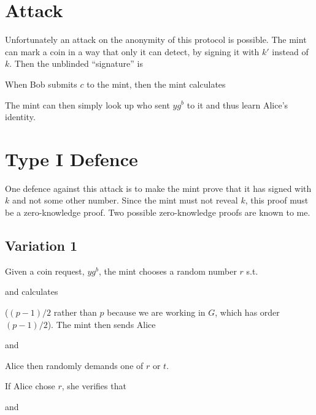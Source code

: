\documentclass[a4paper,titlepage]{article}
\begin{document}
\section{Attack}

Unfortunately an attack on the anonymity of this protocol is
possible. The mint can mark a coin in a way that only it can detect,
by signing it with $k'$ instead of $k$. Then the unblinded
``signature'' is


When Bob submits $c$ to the mint, then the mint calculates


The mint can then simply look up who sent $y g^b$ to it and thus learn
Alice's identity.

\section{Type I Defence}

One defence against this attack is to make the mint prove that it has
signed with $k$ and not some other number. Since the mint must not
reveal $k$, this proof must be a zero-knowledge proof. Two possible
zero-knowledge proofs are known to me.

\subsection{Variation 1\cite{Goldberg2}}

Given a coin request, $y g^b$, the mint chooses a random number $r$
 s.t.


and calculates


($(p-1)/2$ rather than $p$ because we are working in $G$, which has order
$(p-1)/2$). The mint then sends Alice


and


Alice then randomly demands one of $r$ or $t$.

If Alice chose $r$, she verifies that


and

\end{document}
